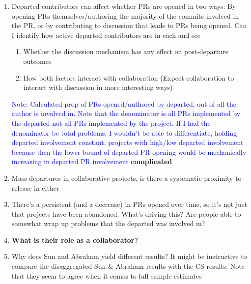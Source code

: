 \documentclass[12pt,notitlepage]{article}
\begin{document}
\begin{enumerate}
    \item Departed contributors can affect whether PRs are opened in two ways: By opening PRs themselves/authoring the majority of the commits involved in the PR, or by contributing to discussion that leads to PRs being opened. Can I identify how active departed contributors are in each and see
    \begin{enumerate}
        \item Whether the discussion mechanism has any effect on post-departure outcomes
        \item How both factors interact with collaboration (Expect collaboration to interact with discussion in more interesting ways)
    \end{enumerate}
    \textcolor{blue}{Note: Calculated prop of PRs opened/authored by departed, out of all the author is involved in. Note that the denominator is all PRs implemented by the departed not all PRs implemented by the project. If I had the denominator be total problems, I wouldn't be able to differentiate, holding departed involvement constant, projects with high/low departed involvement because then the lower bound of departed PR opening would be mechanically increasing in departed PR involvement}
    \textbf{complicated}
    

    \item Mass departures in collaborative projects, is there a systematic proximity to release in either

    \item There's a persistent (and a decrease) in PRs opened over time, so it's not just that projects have been abandoned. What's driving this? Are people able to somewhat wrap up problems that the departed was involved in?
    \item \textbf{What is their role as a collaborator?}
    \item Why does Sun and Abraham yield different results? It might be instructive to compare the disaggregated Sun & Abraham results with the CS results. Note that they seem to agree when it comes to full sample estimates

    
\end{enumerate}
\end{document}
